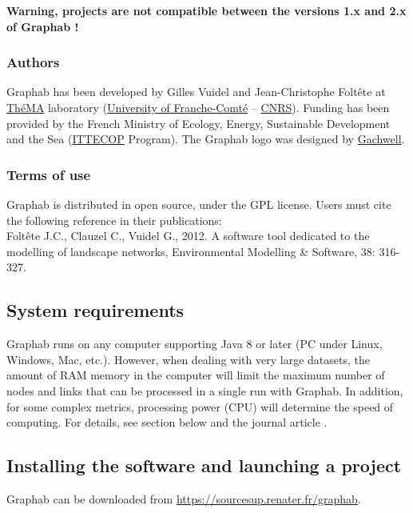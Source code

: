\documentclass{article}
\begin{document}
\textbf{Warning, projects are not compatible between the versions 1.x and 2.x of Graphab !}

\subsubsection{Authors}

Graphab has been developed by Gilles Vuidel and Jean-Christophe Foltête at \href{http://thema.univ-fcomte.fr/}{ThéMA} laboratory (\href{http://www.univ-fcomte.fr}{University of Franche-Comté} – \href{http://www.cnrs.fr}{CNRS}). Funding has been provided by the French Ministry of Ecology, Energy, Sustainable Development and the Sea (\href{http://www.ittecop.fr/}{ITTECOP} Program). The Graphab logo was designed by \href{http://www.gachwell.com/}{Gachwell}.

\subsubsection{Terms of use}

Graphab is distributed in open source, under the GPL license. Users must cite the following reference \cite{2012_graphab_EMS} in their publications:\\
Foltête J.C., Clauzel C., Vuidel G., 2012. A software tool dedicated to the modelling of landscape networks, Environmental Modelling \& Software, 38: 316-327.


\subsection{System requirements}

Graphab runs on any computer supporting Java 8 or later (PC under Linux, Windows, Mac, etc.). However, when dealing with very large datasets, the amount of RAM memory in the computer will limit the maximum number of nodes and links that can be processed in a single run with Graphab. In addition, for some complex metrics, processing power (CPU) will determine the speed of computing. For details, see section  below and the journal article  \cite{2012_graphab_EMS}.

\subsection{Installing the software and launching a project}

Graphab can be downloaded from \url{https://sourcesup.renater.fr/graphab}.
\end{document}
